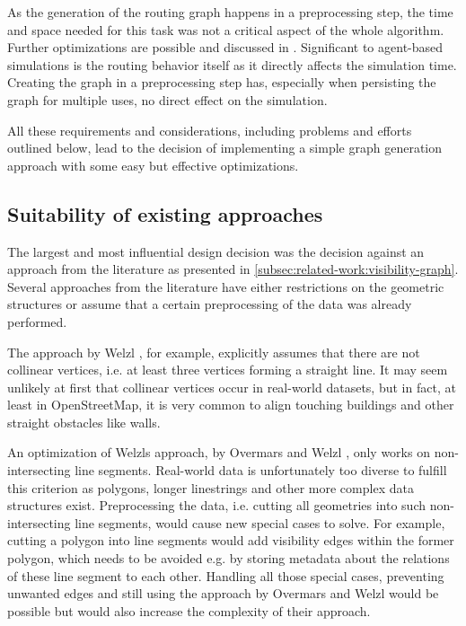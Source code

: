 		As the generation of the routing graph happens in a preprocessing step, the time and space needed for this task was not a critical aspect of the whole algorithm.
		Further optimizations are possible and discussed in .
		Significant to agent-based simulations is the routing behavior itself as it directly affects the simulation time.
		Creating the graph in a preprocessing step has, especially when persisting the graph for multiple uses, no direct effect on the simulation.
		
		All these requirements and considerations, including problems and efforts outlined below, lead to the decision of implementing a simple graph generation approach with some easy but effective optimizations.
	
	\subsection{Suitability of existing approaches}

		The largest and most influential design decision was the decision against an approach from the literature as presented in \cref{subsec:related-work:visibility-graph}.
		Several approaches from the literature have either restrictions on the geometric structures or assume that a certain preprocessing of the data was already performed.
		
		The approach by Welzl \cite{welzl-visibility-graph}, for example, explicitly assumes that there are not collinear vertices, i.e. at least three vertices forming a straight line.
		It may seem unlikely at first that collinear vertices occur in real-world datasets, but in fact, at least in OpenStreetMap, it is very common to align touching buildings and other straight obstacles like walls.
		
		An optimization of Welzls approach, by Overmars and Welzl \cite{overmars-weizl-visibility-graph}, only works on non-intersecting line segments.
		Real-world data is unfortunately too diverse to fulfill this criterion as polygons, longer linestrings and other more complex data structures exist.
		Preprocessing the data, i.e. cutting all geometries into such non-intersecting line segments, would cause new special cases to solve.
		For example, cutting a polygon into line segments would add visibility edges within the former polygon, which needs to be avoided e.g. by storing metadata about the relations of these line segment to each other.
		Handling all those special cases, preventing unwanted edges and still using the approach by Overmars and Welzl would be possible but would also increase the complexity of their approach.
		
